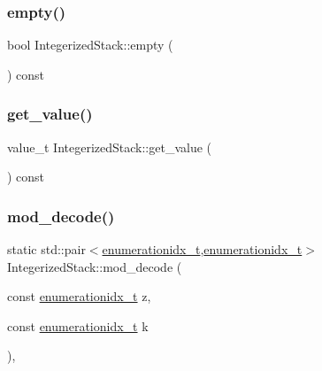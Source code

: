 \subsubsection{\texorpdfstring{empty()}{empty()}}
{\footnotesize\ttfamily bool Integerized\+Stack\+::empty (\begin{DoxyParamCaption}{ }\end{DoxyParamCaption}) const\hspace{0.3cm}{\ttfamily [inline]}}

\mbox{\label{class_integerized_stack_aedecc57b1bbb2c056f57a00ec6eea2e3}} 
\subsubsection{\texorpdfstring{get\+\_\+value()}{get\_value()}}
{\footnotesize\ttfamily value\+\_\+t Integerized\+Stack\+::get\+\_\+value (\begin{DoxyParamCaption}{ }\end{DoxyParamCaption}) const\hspace{0.3cm}{\ttfamily [inline]}}

\mbox{\label{class_integerized_stack_ab7c9b3bf6eb870bd7d74c624b3779cec}} 
\subsubsection{\texorpdfstring{mod\+\_\+decode()}{mod\_decode()}}
{\footnotesize\ttfamily static std\+::pair$<$\hyperlink{_integerized_stack_8h_a9fe2bbca873b046b2bd276fc6856bb88}{enumerationidx\+\_\+t},\hyperlink{_integerized_stack_8h_a9fe2bbca873b046b2bd276fc6856bb88}{enumerationidx\+\_\+t}$>$ Integerized\+Stack\+::mod\+\_\+decode (\begin{DoxyParamCaption}\item[{const \hyperlink{_integerized_stack_8h_a9fe2bbca873b046b2bd276fc6856bb88}{enumerationidx\+\_\+t}}]{z,  }\item[{const \hyperlink{_integerized_stack_8h_a9fe2bbca873b046b2bd276fc6856bb88}{enumerationidx\+\_\+t}}]{k }\end{DoxyParamCaption})\hspace{0.3cm}{\ttfamily [inline]}, {\ttfamily [static]}}

